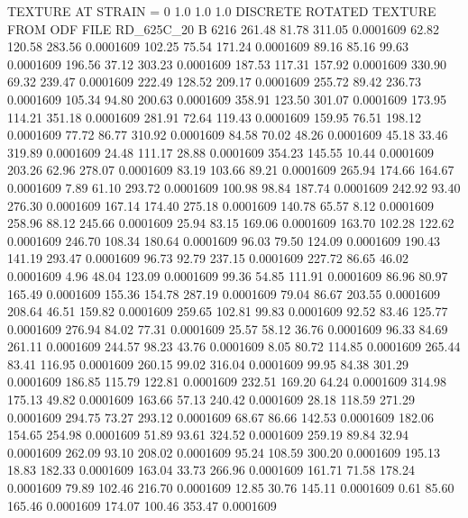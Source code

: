 TEXTURE AT STRAIN = 0
1.0   1.0   1.0
DISCRETE ROTATED TEXTURE FROM ODF FILE RD_625C_20
B 6216
 261.48   81.78  311.05   0.0001609
  62.82  120.58  283.56   0.0001609
 102.25   75.54  171.24   0.0001609
  89.16   85.16   99.63   0.0001609
 196.56   37.12  303.23   0.0001609
 187.53  117.31  157.92   0.0001609
 330.90   69.32  239.47   0.0001609
 222.49  128.52  209.17   0.0001609
 255.72   89.42  236.73   0.0001609
 105.34   94.80  200.63   0.0001609
 358.91  123.50  301.07   0.0001609
 173.95  114.21  351.18   0.0001609
 281.91   72.64  119.43   0.0001609
 159.95   76.51  198.12   0.0001609
  77.72   86.77  310.92   0.0001609
  84.58   70.02   48.26   0.0001609
  45.18   33.46  319.89   0.0001609
  24.48  111.17   28.88   0.0001609
 354.23  145.55   10.44   0.0001609
 203.26   62.96  278.07   0.0001609
  83.19  103.66   89.21   0.0001609
 265.94  174.66  164.67   0.0001609
   7.89   61.10  293.72   0.0001609
 100.98   98.84  187.74   0.0001609
 242.92   93.40  276.30   0.0001609
 167.14  174.40  275.18   0.0001609
 140.78   65.57    8.12   0.0001609
 258.96   88.12  245.66   0.0001609
  25.94   83.15  169.06   0.0001609
 163.70  102.28  122.62   0.0001609
 246.70  108.34  180.64   0.0001609
  96.03   79.50  124.09   0.0001609
 190.43  141.19  293.47   0.0001609
  96.73   92.79  237.15   0.0001609
 227.72   86.65   46.02   0.0001609
   4.96   48.04  123.09   0.0001609
  99.36   54.85  111.91   0.0001609
  86.96   80.97  165.49   0.0001609
 155.36  154.78  287.19   0.0001609
  79.04   86.67  203.55   0.0001609
 208.64   46.51  159.82   0.0001609
 259.65  102.81   99.83   0.0001609
  92.52   83.46  125.77   0.0001609
 276.94   84.02   77.31   0.0001609
  25.57   58.12   36.76   0.0001609
  96.33   84.69  261.11   0.0001609
 244.57   98.23   43.76   0.0001609
   8.05   80.72  114.85   0.0001609
 265.44   83.41  116.95   0.0001609
 260.15   99.02  316.04   0.0001609
  99.95   84.38  301.29   0.0001609
 186.85  115.79  122.81   0.0001609
 232.51  169.20   64.24   0.0001609
 314.98  175.13   49.82   0.0001609
 163.66   57.13  240.42   0.0001609
  28.18  118.59  271.29   0.0001609
 294.75   73.27  293.12   0.0001609
  68.67   86.66  142.53   0.0001609
 182.06  154.65  254.98   0.0001609
  51.89   93.61  324.52   0.0001609
 259.19   89.84   32.94   0.0001609
 262.09   93.10  208.02   0.0001609
  95.24  108.59  300.20   0.0001609
 195.13   18.83  182.33   0.0001609
 163.04   33.73  266.96   0.0001609
 161.71   71.58  178.24   0.0001609
  79.89  102.46  216.70   0.0001609
  12.85   30.76  145.11   0.0001609
   0.61   85.60  165.46   0.0001609
 174.07  100.46  353.47   0.0001609
